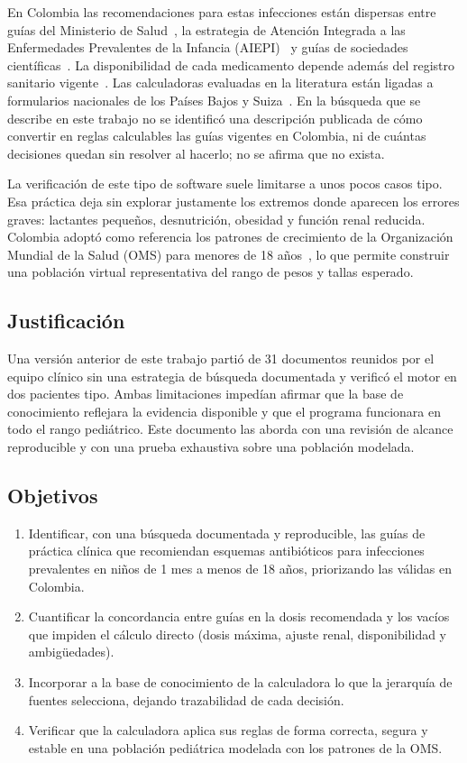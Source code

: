 \documentclass[11pt,a4paper]{article}
\begin{document}
En Colombia las recomendaciones para estas infecciones están dispersas entre guías del Ministerio de Salud~\citep{gpc42}, la estrategia de Atención Integrada a las Enfermedades Prevalentes de la Infancia (AIEPI)~\citep{aiepi2012} y guías de sociedades científicas~\citep{acorloma2024,acorlfaa2024,acorlrs2024,acin2023,itucol2023}. La disponibilidad de cada medicamento depende además del registro sanitario vigente~\citep{invima}. Las calculadoras evaluadas en la literatura están ligadas a formularios nacionales de los Países Bajos y Suiza~\citep{vanderzanden2020,higi2023}. En la búsqueda que se describe en este trabajo no se identificó una descripción publicada de cómo convertir en reglas calculables las guías vigentes en Colombia, ni de cuántas decisiones quedan sin resolver al hacerlo; no se afirma que no exista.

La verificación de este tipo de software suele limitarse a unos pocos casos tipo. Esa práctica deja sin explorar justamente los extremos donde aparecen los errores graves: lactantes pequeños, desnutrición, obesidad y función renal reducida. Colombia adoptó como referencia los patrones de crecimiento de la Organización Mundial de la Salud (OMS) para menores de 18 años~\citep{res2465}, lo que permite construir una población virtual representativa del rango de pesos y tallas esperado.

\subsection{Justificación}

Una versión anterior de este trabajo partió de 31 documentos reunidos por el equipo clínico sin una estrategia de búsqueda documentada y verificó el motor en dos pacientes tipo. Ambas limitaciones impedían afirmar que la base de conocimiento reflejara la evidencia disponible y que el programa funcionara en todo el rango pediátrico. Este documento las aborda con una revisión de alcance reproducible y con una prueba exhaustiva sobre una población modelada.

\subsection{Objetivos}

\begin{enumerate}[label=(\arabic*)]
  \item Identificar, con una búsqueda documentada y reproducible, las guías de práctica clínica que recomiendan esquemas antibióticos para infecciones prevalentes en niños de 1 mes a menos de 18 años, priorizando las válidas en Colombia.
  \item Cuantificar la concordancia entre guías en la dosis recomendada y los vacíos que impiden el cálculo directo (dosis máxima, ajuste renal, disponibilidad y ambigüedades).
  \item Incorporar a la base de conocimiento de la calculadora lo que la jerarquía de fuentes selecciona, dejando trazabilidad de cada decisión.
  \item Verificar que la calculadora aplica sus reglas de forma correcta, segura y estable en una población pediátrica modelada con los patrones de la OMS.
\end{enumerate}
\end{document}

